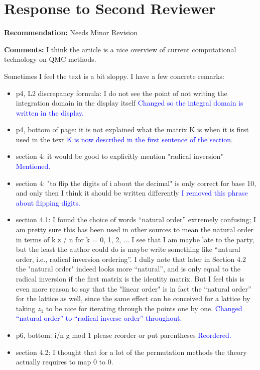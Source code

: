 \documentclass{article}
\newcommand{\response}[1]{{\newline \textcolor{blue}{#1}}}
\begin{document}
\section{Response to Second Reviewer} 

\textbf{Recommendation:} Needs Minor Revision

\noindent\textbf{Comments:} I think the article is a nice overview of current computational technology on QMC methods.

\noindent Sometimes I feel the text is a bit sloppy. I have a few concrete remarks:

\begin{itemize}
    \item p4, L2 discrepancy formula: I do not see the point of not writing the integration domain in the display itself
    \response{Changed so the integral domain is written in the display.}
    \item p4, bottom of page: it is not explained what the matrix K is when it is first used in the text
    \response{$\mathsf{K}$ is now described in the first sentence of the section.}
    \item section 4: it would be good to explicitly mention "radical inversion"
    \response{Mentioned.}
    \item section 4: "to flip the digits of i about the decimal" is only correct for base 10, and only then I think it should be written differently
    \response{I removed this phrase about flipping digits.}
    \item section 4.1: I found the choice of words ``natural order'' extremely confusing; I am pretty sure this has been used in other sources to mean the natural order in terms of k z / n for k = 0, 1, 2, ... I see that I am maybe late to the party, but the least the author could do is maybe write something like ``natural order, i.e., radical inversion ordering''. I dully note that later in Section 4.2 the "natural order" indeed looks more ``natural'', and is only equal to the radical inversion if the first matrix is the identity matrix. But I feel this is even more reason to say that the "linear order" is in fact the ``natural order'' for the lattice as well, since the same effect can be conceived for a lattice by taking $z_1$ to be nice for iterating through the points one by one.
    \response{Changed ``natural order'' to ``radical inverse order'' throughout.} 
    \item p6, bottom: {i/n g mod 1} please reorder or put parentheses
    \response{Reordered.} 
    \item section 4.2: I thought that for a lot of the permutation methods the theory actually requires to map 0 to 0.

\end{itemize}
\end{document}
